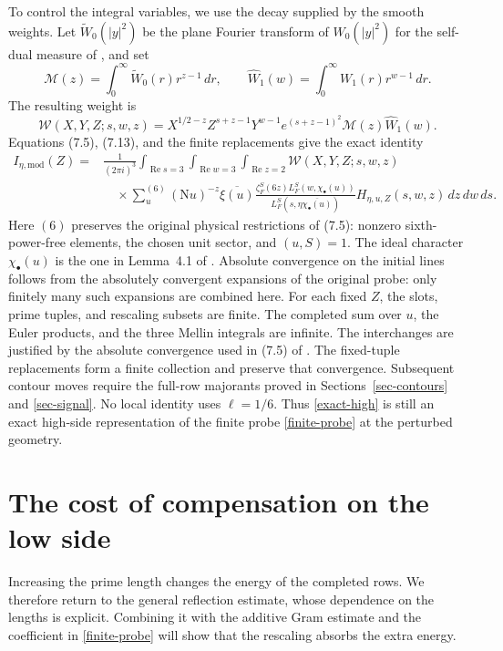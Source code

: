 \documentclass[10pt,reqno,a4paper]{amsart}
\theoremstyle{remark}
\newcommand{\N}{\mathrm N}
\newcommand{\Rea}{\operatorname{Re}}
\begin{document}
To control the integral variables, we use the decay supplied by the
smooth weights. Let
$\widetilde W_0(|y|^2)$ be the plane Fourier transform of $W_0(|y|^2)$
for the self-dual measure of \cite{q30}, and set
\[
 \mathcal M(z)=\int_0^\infty\widetilde W_0(r)r^{z-1}\,dr,
 \qquad
 \widehat W_1(w)=\int_0^\infty W_1(r)r^{w-1}\,dr.
\]
The resulting weight is
\[
 \mathcal W(X,Y,Z;s,w,z)
   =X^{1/2-z}Z^{s+z-1}Y^{w-1}
      e^{(s+z-1)^2}\mathcal M(z)\widehat W_1(w).
\]
Equations (7.5), (7.13), and the finite replacements give the exact
identity
\begin{equation}\label{exact-high}
\begin{aligned}
 I_{\eta,\mathrm{mod}}(Z)
 ={}&\frac1{(2\pi i)^3}
   \int_{\Rea s=3}\int_{\Rea w=3}\int_{\Rea z=2}
       \mathcal W(X,Y,Z;s,w,z)\\
 &\quad\times\sum_u^{(6)}(\N u)^{-z}\overline{\xi(u)}
     \frac{\zeta_F^S(6z)L_F^S(w,\chi_\bullet(u))}
          {L_F^S(s,\eta\overline{\chi_\bullet(u)})}
       H_{\eta,u,Z}(s,w,z)\,dz\,dw\,ds.
\end{aligned}
\end{equation}
Here $(6)$ preserves the original physical restrictions of (7.5):
nonzero sixth-power-free elements, the chosen unit sector, and $(u,S)=1$.
The ideal character $\chi_\bullet(u)$ is the one in Lemma~4.1 of
\cite{q30}. Absolute convergence on the initial lines follows from the absolutely
convergent expansions of the original probe: only finitely many such
expansions are combined here. For each fixed $Z$, the slots, prime tuples, and
rescaling subsets are finite. The completed sum over $u$, the Euler
products, and the three Mellin integrals are infinite. The interchanges are justified by the absolute convergence used in
(7.5) of \cite{q30}. The fixed-tuple replacements form a finite
collection and preserve that convergence. Subsequent contour moves require the full-row
majorants proved in Sections~\ref{sec-contours} and \ref{sec-signal}. No local identity uses $\ell=1/6$. Thus
\eqref{exact-high} is still an exact high-side representation of
the finite probe \eqref{finite-probe} at the perturbed geometry.

\section{The cost of compensation on the low side}\label{sec-low}

Increasing the prime length changes the energy of the completed rows.
We therefore return to the general reflection estimate, whose dependence
on the lengths is explicit. Combining it with the additive Gram estimate
and the coefficient in \eqref{finite-probe} will show that the rescaling
absorbs the extra energy.
\end{document}

